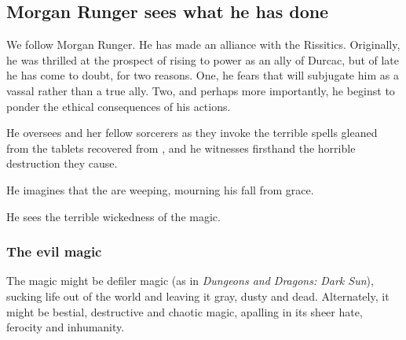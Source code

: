 \begin{garbage}
\subsection{Morgan Runger sees what he has done}
We follow Morgan Runger. He has made an alliance with the Rissitics. Originally, he was thrilled at the prospect of rising to power as an ally of Durcac, but of late he has come to doubt, for two reasons. One, he fears that \Nechsain{} will subjugate him as a vassal rather than a true ally. Two, and perhaps more importantly, he beginst to ponder the ethical consequences of his actions. 

He oversees \Takestsha{} and her fellow sorcerers as they invoke the terrible spells gleaned from the tablets recovered from \Rungertemple, and he witnesses firsthand the horrible destruction they cause. 

He imagines that the \sephiroth{} are weeping, mourning his fall from grace.


He sees the terrible wickedness of the \EreshKali{} magic.






\subsubsection{The evil magic}
The \Rungertemple{} magic might be defiler magic (as in \emph{Dungeons and Dragons: Dark Sun}), sucking life out of the world and leaving it gray, dusty and dead. Alternately, it might be bestial, destructive and chaotic magic, apalling in its sheer hate, ferocity and inhumanity. 


\end{garbage}
